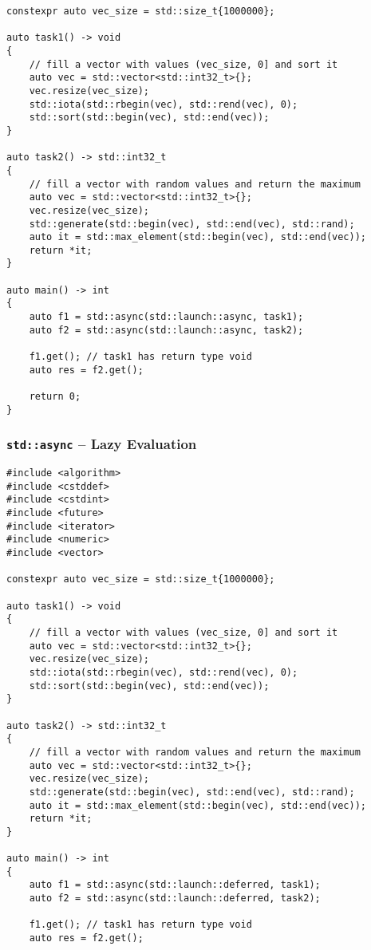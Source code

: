 \begin{appendix}
\begin{verbatim}
constexpr auto vec_size = std::size_t{1000000};

auto task1() -> void
{
    // fill a vector with values (vec_size, 0] and sort it
    auto vec = std::vector<std::int32_t>{};
    vec.resize(vec_size);
    std::iota(std::rbegin(vec), std::rend(vec), 0);
    std::sort(std::begin(vec), std::end(vec));
}

auto task2() -> std::int32_t
{
    // fill a vector with random values and return the maximum
    auto vec = std::vector<std::int32_t>{};
    vec.resize(vec_size);
    std::generate(std::begin(vec), std::end(vec), std::rand);
    auto it = std::max_element(std::begin(vec), std::end(vec));
    return *it;
}

auto main() -> int
{
    auto f1 = std::async(std::launch::async, task1);
    auto f2 = std::async(std::launch::async, task2);
    
    f1.get(); // task1 has return type void
    auto res = f2.get();
    
    return 0;
}
\end{verbatim}

\subsubsection{\texttt{std::async} -- Lazy Evaluation}\label{app:scorep_conc_async_lazy}

\begin{verbatim}
#include <algorithm>
#include <cstddef>
#include <cstdint>
#include <future>
#include <iterator>
#include <numeric>
#include <vector>

constexpr auto vec_size = std::size_t{1000000};

auto task1() -> void
{
    // fill a vector with values (vec_size, 0] and sort it
    auto vec = std::vector<std::int32_t>{};
    vec.resize(vec_size);
    std::iota(std::rbegin(vec), std::rend(vec), 0);
    std::sort(std::begin(vec), std::end(vec));
}

auto task2() -> std::int32_t
{
    // fill a vector with random values and return the maximum
    auto vec = std::vector<std::int32_t>{};
    vec.resize(vec_size);
    std::generate(std::begin(vec), std::end(vec), std::rand);
    auto it = std::max_element(std::begin(vec), std::end(vec));
    return *it;
}

auto main() -> int
{
    auto f1 = std::async(std::launch::deferred, task1);
    auto f2 = std::async(std::launch::deferred, task2);
    
    f1.get(); // task1 has return type void
    auto res = f2.get();
    

\end{verbatim}
\end{appendix}
